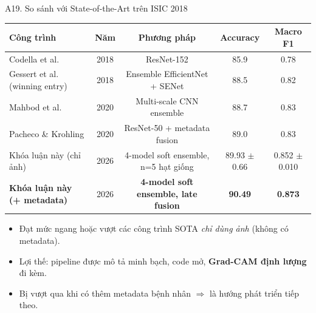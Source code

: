 \documentclass[10pt, aspectratio=169]{beamer}
\begin{document}
\begin{frame}{A19. So sánh với State-of-the-Art trên ISIC 2018}
    \scriptsize
    \begin{table}[]
        \centering
        \begin{tabular}{lcccc}
        \toprule
        \rowcolor{usthblue!25} \textbf{Công trình} & \textbf{Năm} & \textbf{Phương pháp} & \textbf{Accuracy} & \textbf{Macro F1} \\
        \midrule
        Codella et al.       & 2018 & ResNet-152                  & 85.9 & 0.78 \\
        Gessert et al. (winning entry) & 2018 & Ensemble EfficientNet + SENet & 88.5 & 0.82 \\
        Mahbod et al.        & 2020 & Multi-scale CNN ensemble     & 88.7 & 0.83 \\
        Pacheco \& Krohling  & 2020 & ResNet-50 + metadata fusion  & 89.0 & 0.83 \\
        \rowcolor{usthlight}
        Khóa luận này (chỉ ảnh)         & 2026 & 4-model soft ensemble, n=5 hạt giống & 89.93 $\pm$ 0.66 & 0.852 $\pm$ 0.010 \\
    \rowcolor{usthlight}
    \textbf{Khóa luận này (+ metadata)} & 2026 & \textbf{4-model soft ensemble, late fusion} & \textbf{90.49} & \textbf{0.873} \\
        \bottomrule
        \end{tabular}
    \end{table}

    \vspace{0.3cm}
    \footnotesize
    \begin{itemize}
        \item Đạt mức ngang hoặc vượt các công trình SOTA \textit{chỉ dùng ảnh} (không có metadata).
        \item Lợi thế: pipeline được mô tả minh bạch, code mở, \textbf{Grad-CAM định lượng} đi kèm.
        \item Bị vượt qua khi có thêm metadata bệnh nhân $\Rightarrow$ là hướng phát triển tiếp theo.
    \end{itemize}
\end{frame}
\end{document}
